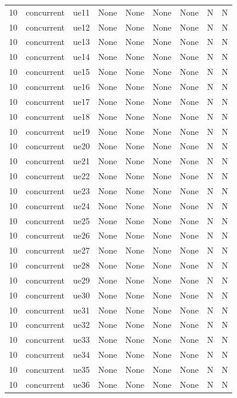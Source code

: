 \begin{table}[ht]
\begin{tabular}{|c|c|c|c|c|c|c|c|c|}
10 & concurrent & ue11 & None & None & None & None & N & N \\
10 & concurrent & ue12 & None & None & None & None & N & N \\
10 & concurrent & ue13 & None & None & None & None & N & N \\
10 & concurrent & ue14 & None & None & None & None & N & N \\
10 & concurrent & ue15 & None & None & None & None & N & N \\
10 & concurrent & ue16 & None & None & None & None & N & N \\
10 & concurrent & ue17 & None & None & None & None & N & N \\
10 & concurrent & ue18 & None & None & None & None & N & N \\
10 & concurrent & ue19 & None & None & None & None & N & N \\
10 & concurrent & ue20 & None & None & None & None & N & N \\
10 & concurrent & ue21 & None & None & None & None & N & N \\
10 & concurrent & ue22 & None & None & None & None & N & N \\
10 & concurrent & ue23 & None & None & None & None & N & N \\
10 & concurrent & ue24 & None & None & None & None & N & N \\
10 & concurrent & ue25 & None & None & None & None & N & N \\
10 & concurrent & ue26 & None & None & None & None & N & N \\
10 & concurrent & ue27 & None & None & None & None & N & N \\
10 & concurrent & ue28 & None & None & None & None & N & N \\
10 & concurrent & ue29 & None & None & None & None & N & N \\
10 & concurrent & ue30 & None & None & None & None & N & N \\
10 & concurrent & ue31 & None & None & None & None & N & N \\
10 & concurrent & ue32 & None & None & None & None & N & N \\
10 & concurrent & ue33 & None & None & None & None & N & N \\
10 & concurrent & ue34 & None & None & None & None & N & N \\
10 & concurrent & ue35 & None & None & None & None & N & N \\
10 & concurrent & ue36 & None & None & None & None & N & N \\

\end{tabular}
\end{table}
